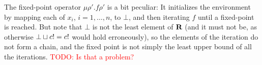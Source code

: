 \documentclass[parskip=half]{scrartcl}
\newcommand{\TODO}[1]{\textcolor{red}{TODO: #1}}
\begin{document}
The fixed-point operator $\mu \rho'. f \rho'$ is a bit peculiar: It initializes the environment by mapping each of $x_i$, $i=1,\ldots,n$, to $\bot$, and then iterating $f$ until a fixed-point is reached. But note that $\bot$ is not the least element of $\textbf{R}$ (and it must not be, as otherwise $\bot \sqcup c! = c!$ would hold erroneously), so the elements of the iteration do not form a chain, and the fixed point is not simply the least upper bound of all the iterations. \TODO{Is that a problem?}
\end{document}
